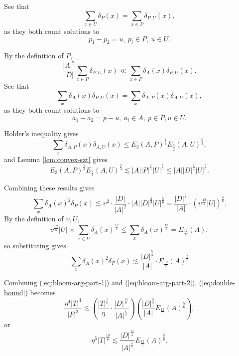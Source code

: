 \documentclass[reqno]{amsart}
\newcommand{\holder}{H\"older}
\numberwithin{equation}{section}
\begin{document}
See that
\[
    \sum _{x \in U} \delta_{P} (x) = \sum _{x \in P} \delta_{P,U} (x)
,\]
as they both count solutions to
\[
    p_1-p_2 = u ,~ p_{i} \in P,~ u \in U
.\]

By the definition of \(P\),
\[
    \frac{\left\lvert A \right\rvert ^{2}}{\left\lvert D \right\rvert } \sum _{x \in P} \delta_{P,U} (x) \ll \sum _{x \in P} \delta_{A} (x) \delta_{P,U} (x)
.\]
See that
\[
    \sum _{x}  \delta_{A} (x) \delta_{P,U} (x) = \sum _{x} \delta_{A,P} (x)\delta_{A,U} (x)
,\]
as they both count solutions to
\[
    a_1 - a_2 = p - u ,~ a_{i} \in A,~ p \in P, u \in U
.\]

\holder's inequality gives
\[
    \sum _{x} \delta_{A,P} (x) \delta_{A,U} (x) \leq E_3(A,P)^{\frac{1}{3} } E_{\frac{3}{2} } (A,U)^{\frac{2}{3} }
,\]
and Lemma \ref{lem:convex-szt} gives
\[
    E_3(A,P)^{\frac{1}{3} } E_{\frac{3}{2} } (A,U)^{\frac{2}{3} } \lesssim \left\lvert A \right\rvert \left\lvert P \right\rvert ^{\frac{2}{3} }\left\lvert U \right\rvert ^{\frac{5}{6} }\leq \left\lvert A \right\rvert \left\lvert D \right\rvert ^{\frac{2}{3} }\left\lvert U \right\rvert ^{\frac{5}{6} }
.\]  

Combining these results gives
\[
    \sum _{x} \delta_{A} (x) ^{2}\delta_{P} (x) \lesssim \upsilon ^{2}\cdot \frac{\left\lvert D \right\rvert }{\left\lvert A \right\rvert ^{2}} \cdot \left\lvert A \right\rvert \left\lvert D \right\rvert ^{\frac{2}{3} }\left\lvert U \right\rvert ^{\frac{5}{6} } = \frac{\left\lvert D \right\rvert ^{\frac{5}{3} }}{\left\lvert A \right\rvert } \cdot \left( \upsilon^{\frac{12}{5} } \left\lvert U \right\rvert  \right) ^{\frac{5}{6} }
.\]
By the definition of \(\upsilon,U\),
\[
    \upsilon^{\frac{12}{5} } \left\lvert U \right\rvert \asymp \sum _{x \in U} \delta_{A} (x)^{\frac{12}{5} } \leq \sum _{x}  \delta_{A} (x) ^{\frac{12}{5} } = E_{\frac{12}{5} } (A)
,\]
so substituting gives
\begin{equation} \label{eq:bloom-arg-part-2}
    \sum _{x} \delta_{A} (x) ^{2}\delta_{P} (x) \lesssim \frac{\left\lvert D \right\rvert ^{\frac{5}{3} }}{\left\lvert A \right\rvert } \cdot E_{\frac{12}{5} } (A)^{\frac{5}{6} }
\end{equation}

Combining (\ref{eq:bloom-arg-part-1}) and (\ref{eq:bloom-arg-part-2}), (\ref{eq:double-bound}) becomes
\[
    \frac{\eta^{4} \left\lvert T  \right\rvert ^{4}}{\left\lvert P \right\rvert ^{2}} \lesssim \left( \frac{\left\lvert T \right\rvert ^{\frac{5}{6} }}{\eta}     \cdot \frac{\left\lvert D \right\rvert ^{\frac{11}{6} }}{\left\lvert A \right\rvert ^{\frac{1}{3} }}  \right)  \left( \frac{\left\lvert D \right\rvert ^{\frac{5}{3} }}{\left\lvert A \right\rvert } E_{\frac{12}{5} } (A)^{\frac{5}{6} } \right) 
,\]
or
\begin{equation} \label{eq:to-interpolate}
    \eta^{5} \left\lvert T \right\rvert ^{\frac{19}{6} } \lesssim \frac{\left\lvert D \right\rvert ^{\frac{11}{2} }}{\left\lvert A \right\rvert ^{\frac{4}{3} }} E_{\frac{12}{5} } (A) ^{\frac{5}{6} } .
\end{equation}
\end{document}
